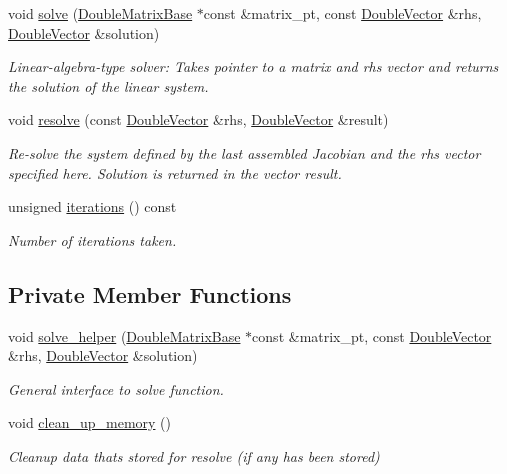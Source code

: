 \begin{DoxyCompactItemize}
void \hyperlink{classoomph_1_1CG_a764dbdc8e63d9dfe0945015399a83c18}{solve} (\hyperlink{classoomph_1_1DoubleMatrixBase}{Double\+Matrix\+Base} $\ast$const \&matrix\+\_\+pt, const \hyperlink{classoomph_1_1DoubleVector}{Double\+Vector} \&rhs, \hyperlink{classoomph_1_1DoubleVector}{Double\+Vector} \&solution)
\begin{DoxyCompactList}\small\item\em Linear-\/algebra-\/type solver\+: Takes pointer to a matrix and rhs vector and returns the solution of the linear system. \end{DoxyCompactList}\item 
void \hyperlink{classoomph_1_1CG_a147e640c19c2159285da0b3b5c51af63}{resolve} (const \hyperlink{classoomph_1_1DoubleVector}{Double\+Vector} \&rhs, \hyperlink{classoomph_1_1DoubleVector}{Double\+Vector} \&result)
\begin{DoxyCompactList}\small\item\em Re-\/solve the system defined by the last assembled Jacobian and the rhs vector specified here. Solution is returned in the vector result. \end{DoxyCompactList}\item 
unsigned \hyperlink{classoomph_1_1CG_a17db796814dc11cb67eac960df85d5f7}{iterations} () const
\begin{DoxyCompactList}\small\item\em Number of iterations taken. \end{DoxyCompactList}\end{DoxyCompactItemize}
\subsection*{Private Member Functions}
\begin{DoxyCompactItemize}
\item 
void \hyperlink{classoomph_1_1CG_adbb17880d5464362b9e7a1cfa52dffec}{solve\+\_\+helper} (\hyperlink{classoomph_1_1DoubleMatrixBase}{Double\+Matrix\+Base} $\ast$const \&matrix\+\_\+pt, const \hyperlink{classoomph_1_1DoubleVector}{Double\+Vector} \&rhs, \hyperlink{classoomph_1_1DoubleVector}{Double\+Vector} \&solution)
\begin{DoxyCompactList}\small\item\em General interface to solve function. \end{DoxyCompactList}\item 
void \hyperlink{classoomph_1_1CG_ab51014aac249e9998a002509c7a3088e}{clean\+\_\+up\+\_\+memory} ()
\begin{DoxyCompactList}\small\item\em Cleanup data that\textquotesingle{}s stored for resolve (if any has been stored) \end{DoxyCompactList}\end{DoxyCompactItemize}
